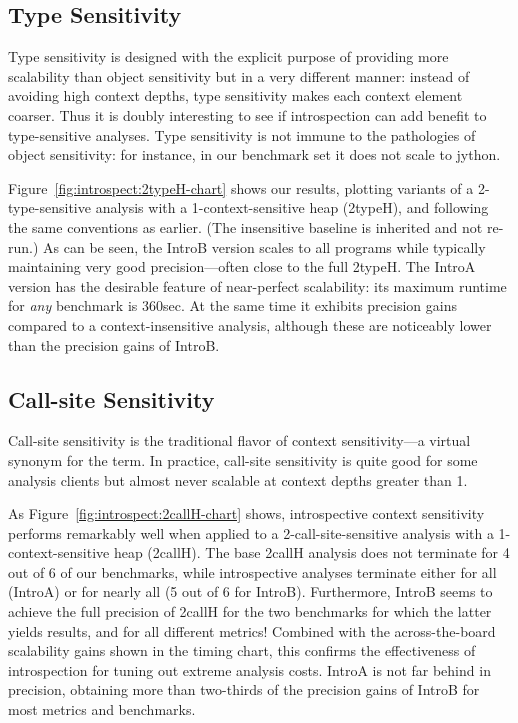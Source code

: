 \subsection{Type Sensitivity}
Type sensitivity is designed with the explicit purpose of providing more scalability than object sensitivity but in a very different manner: instead of avoiding high context depths, type sensitivity makes each context element coarser. Thus it is doubly interesting to see if introspection can add benefit to type-sensitive analyses. Type sensitivity is not immune to the pathologies of object sensitivity: for instance, in our benchmark set it does not scale to jython. 

Figure~\ref{fig:introspect:2typeH-chart} shows our results, plotting variants of a 2-type-sensitive analysis with a 1-context-sensitive heap (2typeH), and following the same conventions as earlier. (The insensitive baseline is inherited and not re-run.) As can be seen, the IntroB version scales to all programs while typically maintaining very good precision---often close to the full 2typeH. The IntroA version has the desirable feature of near-perfect scalability: its maximum runtime for \emph{any} benchmark is 360sec. At the same time it exhibits precision gains compared to a context-insensitive analysis, although these are noticeably lower than the precision gains of IntroB.


\subsection{Call-site Sensitivity}
Call-site sensitivity is the traditional flavor of context sensitivity---a virtual synonym for the term. In practice, call-site sensitivity is quite good for some analysis clients but almost never scalable at context depths greater than 1. 

As Figure~\ref{fig:introspect:2callH-chart} shows, introspective context sensitivity performs remarkably well when applied to a 2-call-site-sensitive analysis with a 1-context-sensitive heap (2callH). The base 2callH analysis does not terminate for 4 out of 6 of our benchmarks, while introspective analyses terminate either for all (IntroA) or for nearly all (5 out of 6 for IntroB). Furthermore, IntroB seems to achieve the full precision of 2callH for the two benchmarks for which the latter yields results, and for all different metrics! Combined with the across-the-board scalability gains shown in the timing chart, this confirms the effectiveness of introspection for tuning out extreme analysis costs. IntroA is not far behind in precision, obtaining more than two-thirds of the precision gains of IntroB for most metrics and benchmarks.


